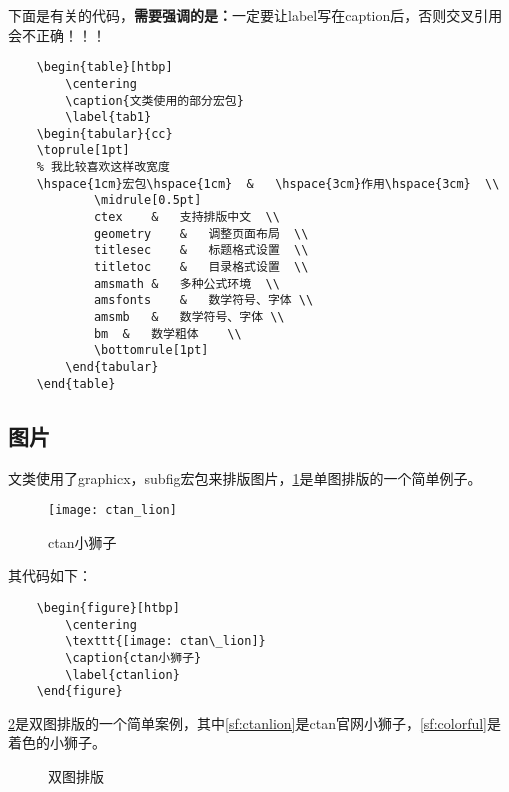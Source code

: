 下面是有关的代码，\textbf{需要强调的是：}{\color[rgb]{1.00,0.00,0.00}一定要让label写在caption后，否则交叉引用会不正确！！！}
\begin{verbatim}
	\begin{table}[htbp]
		\centering
		\caption{文类使用的部分宏包}
		\label{tab1}
	\begin{tabular}{cc}
	\toprule[1pt]
	% 我比较喜欢这样改宽度
	\hspace{1cm}宏包\hspace{1cm}	&	\hspace{3cm}作用\hspace{3cm}	\\
			\midrule[0.5pt]
			ctex	& 	支持排版中文	\\
			geometry	&	调整页面布局	\\
			titlesec	&	标题格式设置	\\
			titletoc	&	目录格式设置	\\
			amsmath	&	多种公式环境	\\
			amsfonts	&	数学符号、字体	\\
			amsmb	&	数学符号、字体	\\
			bm	&	数学粗体	\\
			\bottomrule[1pt]
		\end{tabular}	
	\end{table}
\end{verbatim}

\subsection{图片}
文类使用了graphicx，subfig宏包来排版图片，\cref{ctanlion}是单图排版的一个简单例子。
\begin{figure}[htbp]
	\centering
	\texttt{[image: ctan\_lion]}
	\caption{ctan小狮子}
	\label{ctanlion}
\end{figure}

其代码如下：
\begin{verbatim}
	\begin{figure}[htbp]
		\centering
		\texttt{[image: ctan\_lion]}
		\caption{ctan小狮子}
		\label{ctanlion}
	\end{figure}
\end{verbatim}

\cref{twofig}是双图排版的一个简单案例，其中\cref{sf:ctanlion}是ctan官网小狮子，\cref{sf:colorful}是着色的小狮子。

\begin{figure}[htbp]
	\centering
	\hspace{1em}
	\caption{双图排版}
	\label{twofig}
\end{figure}

